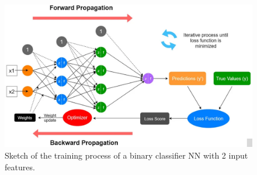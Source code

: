 \begin{figure}[H]
    \centering
    \includegraphics[width=0.85\linewidth]{fig/chap05-stats/dnn.png}
    \caption{Sketch of the training process of a binary classifier NN with 2 input features.}
    \label{fig:dnn}
\end{figure}




